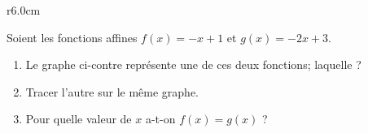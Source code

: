 
\begin{exercice}\label{exosmath-0573}

\begin{wrapfigure}{r}{6.0cm}
   \vspace{-0.5cm}        %
   \centering
   
\end{wrapfigure}

    Soient les fonctions affines \( f(x)=-x+1\) et \( g(x)=-2x+3\). 
    \begin{enumerate}
        \item
            Le graphe ci-contre représente une de ces deux fonctions; laquelle ?
        \item
            Tracer l'autre sur le même graphe.
        \item
            Pour quelle valeur de \( x\) a-t-on \( f(x)=g(x)\) ? 
    \end{enumerate}


\end{exercice}
